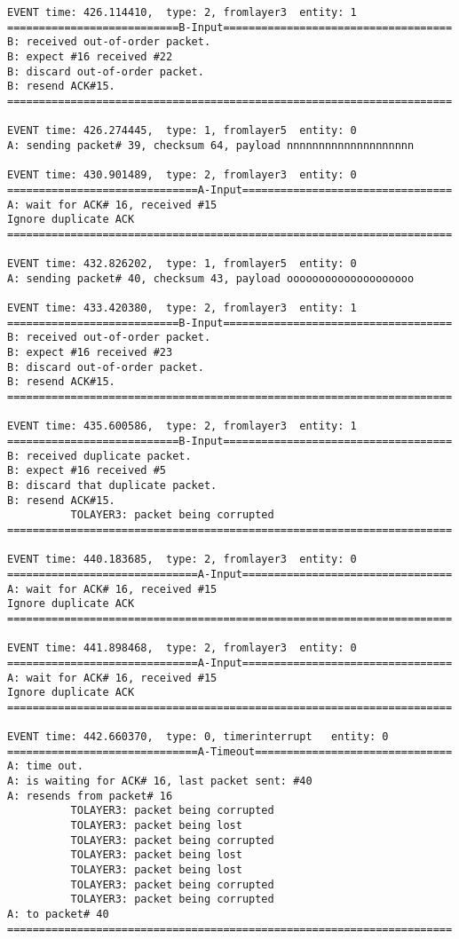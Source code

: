 \documentclass[12pt]{article}
\begin{document}
\begin{verbatim}
EVENT time: 426.114410,  type: 2, fromlayer3  entity: 1
===========================B-Input====================================
B: received out-of-order packet.
B: expect #16 received #22
B: discard out-of-order packet.
B: resend ACK#15.
======================================================================

EVENT time: 426.274445,  type: 1, fromlayer5  entity: 0
A: sending packet# 39, checksum 64, payload nnnnnnnnnnnnnnnnnnnn

EVENT time: 430.901489,  type: 2, fromlayer3  entity: 0
==============================A-Input=================================
A: wait for ACK# 16, received #15
Ignore duplicate ACK
======================================================================

EVENT time: 432.826202,  type: 1, fromlayer5  entity: 0
A: sending packet# 40, checksum 43, payload oooooooooooooooooooo

EVENT time: 433.420380,  type: 2, fromlayer3  entity: 1
===========================B-Input====================================
B: received out-of-order packet.
B: expect #16 received #23
B: discard out-of-order packet.
B: resend ACK#15.
======================================================================

EVENT time: 435.600586,  type: 2, fromlayer3  entity: 1
===========================B-Input====================================
B: received duplicate packet.
B: expect #16 received #5
B: discard that duplicate packet.
B: resend ACK#15.
          TOLAYER3: packet being corrupted
======================================================================

EVENT time: 440.183685,  type: 2, fromlayer3  entity: 0
==============================A-Input=================================
A: wait for ACK# 16, received #15
Ignore duplicate ACK
======================================================================

EVENT time: 441.898468,  type: 2, fromlayer3  entity: 0
==============================A-Input=================================
A: wait for ACK# 16, received #15
Ignore duplicate ACK
======================================================================

EVENT time: 442.660370,  type: 0, timerinterrupt   entity: 0
==============================A-Timeout===============================
A: time out. 
A: is waiting for ACK# 16, last packet sent: #40
A: resends from packet# 16 
          TOLAYER3: packet being corrupted
          TOLAYER3: packet being lost
          TOLAYER3: packet being corrupted
          TOLAYER3: packet being lost
          TOLAYER3: packet being lost
          TOLAYER3: packet being corrupted
          TOLAYER3: packet being corrupted
A: to packet# 40
======================================================================


\end{verbatim}
\end{document}
